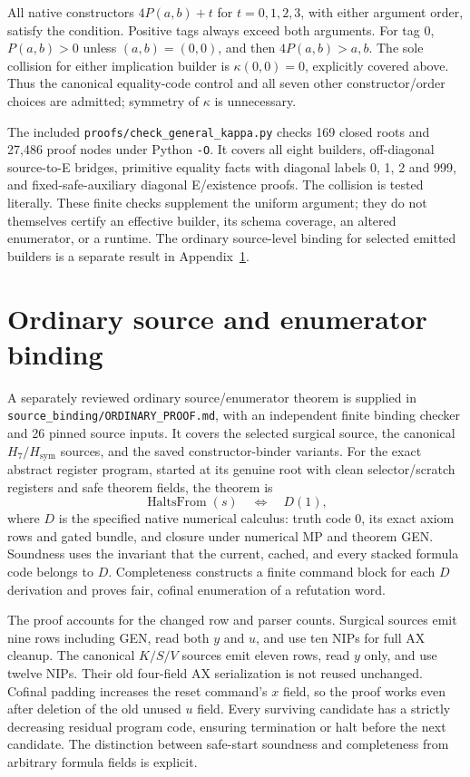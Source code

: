 \documentclass[11pt,letterpaper]{article}
\theoremstyle{definition}\newtheorem{definition}[theorem]{Definition}
\theoremstyle{remark}\newtheorem{remark}[theorem]{Remark}
\newcommand{\file}[1]{\begingroup\small\ttfamily\nolinkurl{#1}\endgroup}
\begin{document}
All native constructors $4P(a,b)+t$ for $t=0,1,2,3$, with either argument order, satisfy the condition. Positive tags always exceed both arguments. For tag 0, $P(a,b)>0$ unless $(a,b)=(0,0)$, and then $4P(a,b)>a,b$. The sole collision for either implication builder is $\kappa(0,0)=0$, explicitly covered above. Thus the canonical equality-code control and all seven other constructor/order choices are admitted; symmetry of $\kappa$ is unnecessary.

The included \file{proofs/check_general_kappa.py} checks 169 closed roots and 27,486 proof nodes under Python \file{-O}. It covers all eight builders, off-diagonal source-to-E bridges, primitive equality facts with diagonal labels 0, 1, 2 and 999, and fixed-safe-auxiliary diagonal E/existence proofs. The collision is tested literally. These finite checks supplement the uniform argument; they do not themselves certify an effective builder, its schema coverage, an altered enumerator, or a runtime. The ordinary source-level binding for selected emitted builders is a separate result in Appendix~\ref{sec:binding}.

\section{Ordinary source and enumerator binding}\label{sec:binding}
A separately reviewed ordinary source/enumerator theorem is supplied in \file{source_binding/ORDINARY_PROOF.md}, with an independent finite binding checker and 26 pinned source inputs. It covers the selected surgical source, the canonical $H_7/H_{\mathrm{sym}}$ sources, and the saved constructor-binder variants. For the exact abstract register program, started at its genuine root with clean selector/scratch registers and safe theorem fields, the theorem is
\[
 \operatorname{HaltsFrom}(s)\quad\Longleftrightarrow\quad D(1),
\]
where $D$ is the specified native numerical calculus: truth code 0, its exact axiom rows and gated bundle, and closure under numerical MP and theorem GEN. Soundness uses the invariant that the current, cached, and every stacked formula code belongs to $D$. Completeness constructs a finite command block for each $D$ derivation and proves fair, cofinal enumeration of a refutation word.

The proof accounts for the changed row and parser counts. Surgical sources emit nine rows including GEN, read both $y$ and $u$, and use ten NIPs for full AX cleanup. The canonical $K/S/V$ sources emit eleven rows, read $y$ only, and use twelve NIPs. Their old four-field AX serialization is not reused unchanged. Cofinal padding increases the reset command's $x$ field, so the proof works even after deletion of the old unused $u$ field. Every surviving candidate has a strictly decreasing residual program code, ensuring termination or halt before the next candidate. The distinction between safe-start soundness and completeness from arbitrary formula fields is explicit.
\end{document}
